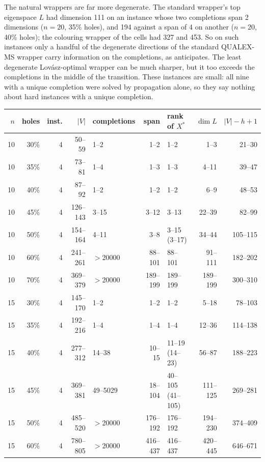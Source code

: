 \documentclass[11pt]{article}
\theoremstyle{definition}
\theoremstyle{remark}
\begin{document}
The natural wrappers are far more degenerate. The standard wrapper's top
eigenspace $L$ had dimension 111 on an instance whose two completions span 2
dimensions ($n=20$, 35\% holes), and 194 against a span of 4 on another
($n=20$, 40\% holes); the colouring wrapper of the cells had 327 and 453.
So on such instances only a handful of the degenerate directions of the
standard QUALEX-MS wrapper carry information on the completions, as
\cite{BP03} anticipates. The least degenerate Lov\'asz-optimal wrapper can be
much sharper, but it too exceeds the completions in the middle of the
transition. These instances are small: all nine with a unique completion
were solved by propagation alone, so they say nothing about hard instances
with a unique completion.

\begin{table}[ht]
\begin{center}
\small
\setlength\tabcolsep{4pt}
\begin{tabular}{|r|r|r|r|l|r|l|r|r|}
\hline
$n$ & holes & inst. & $|V|$ & completions & span & rank of $X^*$ & $\dim L$ & $|V|-h+1$ \\
\hline
10 & 30\% & 4 & 50--59 & 1--2 & 1--2 & 1--2 & 1--3 & 21--30 \\
10 & 35\% & 4 & 73--81 & 1--4 & 1--3 & 1--3 & 4--11 & 39--47 \\
10 & 40\% & 4 & 87--92 & 1--2 & 1--2 & 1--2 & 6--9 & 48--53 \\
10 & 45\% & 4 & 126--143 & 3--15 & 3--12 & 3--13 & 22--39 & 82--99 \\
10 & 50\% & 4 & 154--164 & 4--11 & 3--8 & 3--15 (3--17) & 34--44 & 105--115 \\
10 & 60\% & 4 & 241--261 & $>$20000 & 88--101 & 88--101 & 91--111 & 182--202 \\
10 & 70\% & 4 & 369--379 & $>$20000 & 189--199 & 189--199 & 189--199 & 300--310 \\
15 & 30\% & 4 & 145--170 & 1--2 & 1--2 & 1--2 & 5--18 & 78--103 \\
15 & 35\% & 4 & 192--216 & 1--4 & 1--4 & 1--4 & 12--36 & 114--138 \\
15 & 40\% & 4 & 277--312 & 14--38 & 10--15 & 11--19 (14--23) & 56--87 & 188--223 \\
15 & 45\% & 4 & 369--381 & 49--5029 & 18--104 & 40--105 (41--105) & 111--125 & 269--281 \\
15 & 50\% & 4 & 485--520 & $>$20000 & 176--192 & 176--192 & 194--230 & 374--409 \\
15 & 60\% & 4 & 780--805 & $>$20000 & 416--437 & 416--437 & 420--445 & 646--671 \\

\end{tabular}
\end{center}
\end{table}
\end{document}
